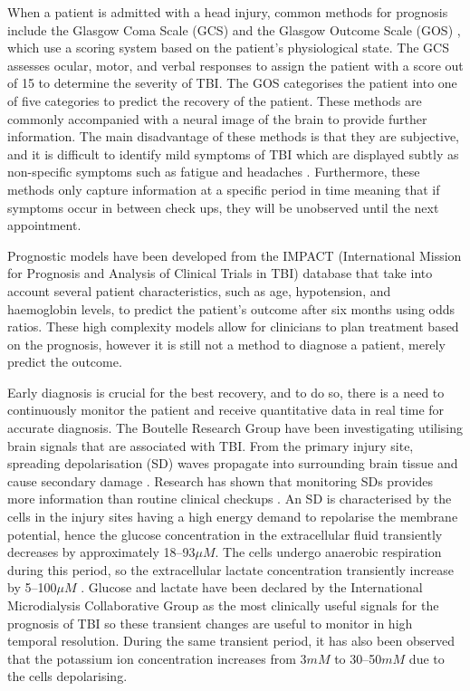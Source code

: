 When a patient is admitted with a head injury, common methods for prognosis include the Glasgow Coma Scale (GCS) \cite{WorldHealthOrganisation2006} and the Glasgow Outcome Scale (GOS) \cite{Jennett1975}, which use a scoring system based on the patient's physiological state. The GCS assesses ocular, motor, and verbal responses to assign the patient with a score out of 15 to determine the severity of TBI. The GOS categorises the patient into one of five categories to predict the recovery of the patient. These methods are commonly accompanied with a neural image of the brain to provide further information. The main disadvantage of these methods is that they are subjective, and it is difficult to identify mild symptoms of TBI which are displayed subtly as non-specific symptoms such as fatigue and headaches \cite{Bettermann2012}. Furthermore, these methods only capture information at a specific period in time meaning that if symptoms occur in between check ups, they will be unobserved until the next appointment. 

Prognostic models \cite{Steyerberg2008} have been developed from the IMPACT (International Mission for Prognosis and Analysis of Clinical Trials in TBI) database \cite{Maas2007} that take into account several patient characteristics, such as age, hypotension, and haemoglobin levels, to predict the patient's outcome after six months using odds ratios. These high complexity models allow for clinicians to plan treatment based on the prognosis, however it is still not a method to diagnose a patient, merely predict the outcome. 

Early diagnosis is crucial for the best recovery, and to do so, there is a need to continuously monitor the patient and receive quantitative data in real time for accurate diagnosis. The Boutelle Research Group have been investigating utilising brain signals that are associated with TBI. From the primary injury site, spreading depolarisation (SD) waves \cite{Leao1944} propagate into surrounding brain tissue and cause secondary damage \cite{Brain2011}. Research has shown that monitoring SDs provides more information than routine clinical checkups \cite{Hartings2011}. An SD is characterised by the cells in the injury sites having a high energy demand to repolarise the membrane potential, hence the glucose concentration in the extracellular fluid transiently decreases by approximately 18--93$\mu M$. The cells undergo anaerobic respiration during this period, so the extracellular lactate concentration transiently increase by 5--100$\mu M$ \cite{D.2010}. Glucose and lactate have been declared by the International Microdialysis Collaborative Group as the most clinically useful signals for the prognosis of TBI \cite{Hutchinson2015} so these transient changes are useful to monitor in high temporal resolution. During the same transient period, it has also been observed that the potassium ion concentration increases \cite{Rogers2011} from 3$mM$ \cite{Katzman1976} to 30--50$mM$ \cite{Ayata2015} due to the cells depolarising. 



